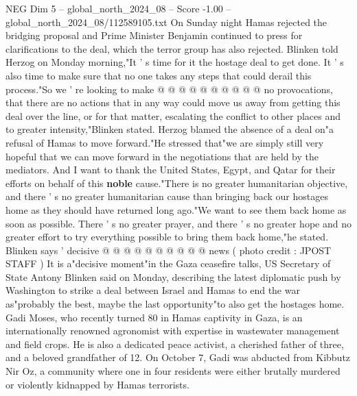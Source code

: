 \begin{textsample}{NEG Dim 5 – global\_north\_2024\_08 – Score -1.00 – global\_north\_2024\_08/112589105.txt}
On Sunday night Hamas rejected the bridging proposal and Prime Minister Benjamin continued to press for clarifications to the deal, which the terror group has also rejected.
Blinken told Herzog on Monday morning,"It ' s time for it the hostage deal to get done.
It ' s also time to make sure that no one takes any steps that could derail this process."So we ' re looking to make @ @ @ @ @ @ @ @ @ @ no provocations, that there are no actions that in any way could move us away from getting this deal over the line, or for that matter, escalating the conflict to other places and to greater intensity,"Blinken stated.
Herzog blamed the absence of a deal on"a refusal of Hamas to move forward."He stressed that"we are simply still very hopeful that we can move forward in the negotiations that are held by the mediators.
And I want to thank the United States, Egypt, and Qatar for their efforts on behalf of this \textbf{noble} cause."There is no greater humanitarian objective, and there ' s no greater humanitarian cause than bringing back our hostages home as they should have returned long ago."We want to see them back home as soon as possible.
There ' s no greater prayer, and there ' s no greater hope and no greater effort to try everything possible to bring them back home,"he stated.
Blinken says ' decisive @ @ @ @ @ @ @ @ @ @ news ( photo credit : JPOST STAFF ) It is a"decisive moment"in the Gaza ceasefire talks, US Secretary of State Antony Blinken said on Monday, describing the latest diplomatic push by Washington to strike a deal between Israel and Hamas to end the war as"probably the best, maybe the last opportunity"to also get the hostages home.
Gadi Moses, who recently turned 80 in Hamas captivity in Gaza, is an internationally renowned agronomist with expertise in wastewater management and field crops.
He is also a dedicated peace activist, a cherished father of three, and a beloved grandfather of 12.
On October 7, Gadi was abducted from Kibbutz Nir Oz, a community where one in four residents were either brutally murdered or violently kidnapped by Hamas terrorists.

\end{textsample}
